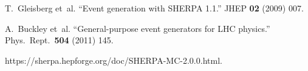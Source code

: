 \documentclass[10pt]{article}
\begin{document}
\begin{thebibliography}{1}

T.~Gleisberg et~al.
``Event generation with SHERPA 1.1.''
JHEP {\bf 02} (2009) 007.

A.~Buckley et~al.
``General-purpose event generators for LHC physics.''
Phys.\ Rept.\ {\bf 504} (2011) 145.

https://sherpa.hepforge.org/doc/SHERPA-MC-2.0.0.html.

\end{thebibliography}
\end{document}
